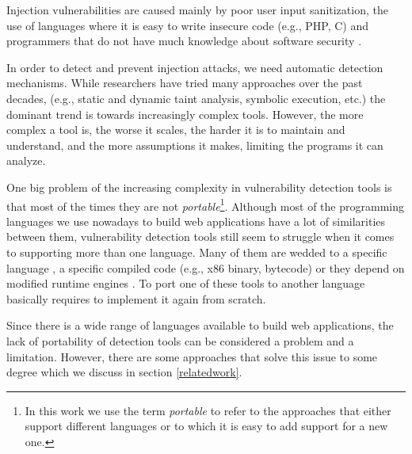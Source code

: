 Injection vulnerabilities are caused mainly by poor user input sanitization, the use of languages where it is easy to write insecure code (e.g., PHP, C) and programmers that do not have much knowledge about software security \cite{jain2011review}.

In order to detect and prevent injection attacks, we need automatic detection mechanisms.
While researchers have tried many approaches over the past decades, (e.g., static and dynamic taint analysis, symbolic execution, etc.) the dominant trend is towards increasingly complex tools. However, the more complex a tool is, the worse it scales, the harder it is to maintain and understand, and the more assumptions it makes, limiting the programs it can analyze. 

One big problem of the increasing complexity in vulnerability detection tools is that most of the times they are not \textit{portable}\footnote{In this work we use the term \textit{portable} to refer to the approaches that either support different languages or to which it is easy to add support for a new one.}. Although most of the programming languages we use nowadays to build web applications have a lot of similarities between them, vulnerability detection tools still seem to struggle when it comes to supporting more than one language. Many of them are wedded to a specific language \cite{diglossia,phpapis,jovanovic2006pixy, arzt2014flowdroid,nunes2015phpsafe,wassermann2008static, dahse2014simulation,livshits2005finding}, a specific compiled code \cite{dytan,taintcheck,dt++} (e.g., x86 binary, bytecode) or they depend on modified runtime engines \cite{diglossia,phosphor}. To port one of these tools to another language basically requires to implement it again from scratch. 

Since there is a wide range of languages available to build web applications, the lack of portability of detection tools can be considered a problem and a limitation. However, there are some approaches that solve this issue to some degree which we discuss in section \ref{relatedwork}. 

